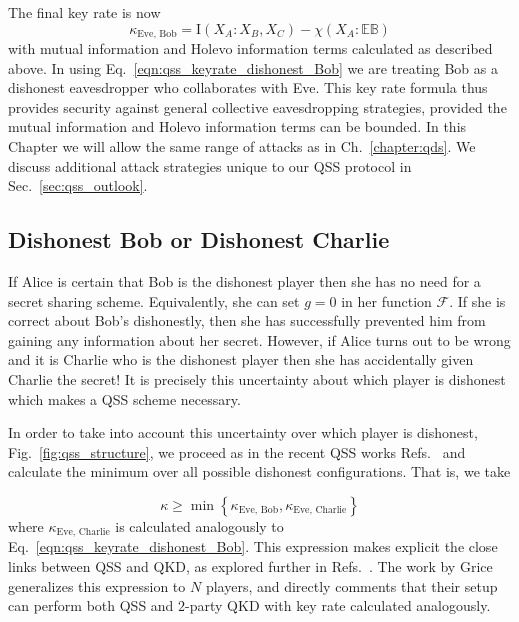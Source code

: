 The final key rate is now
\begin{equation}\label{eqn:qss_keyrate_dishonest_Bob}
\kappa_{\text{Eve, Bob}} = \text{I}\left(X_A : X_B, X_C\right) - \chi\left(X_A : \mathbb{E} \mathbb{B}\right)
\end{equation}
with mutual information and Holevo information terms calculated as described above. In using Eq.~\ref{eqn:qss_keyrate_dishonest_Bob} we are treating Bob as a dishonest eavesdropper who collaborates with Eve. This key rate formula thus provides security against general collective eavesdropping strategies, provided the mutual information and Holevo information terms can be bounded. In this Chapter we will allow the same range of attacks as in Ch.~\ref{chapter:qds}. We discuss additional attack strategies unique to our QSS protocol in Sec.~\ref{sec:qss_outlook}. 




\subsection{Dishonest Bob or Dishonest Charlie}
If Alice is certain that Bob is the dishonest player then she has no need for a secret sharing scheme. Equivalently, she can set $g=0$ in her function $\mathcal{F}$. If she is correct about Bob's dishonestly, then she has successfully prevented him from gaining any information about her secret. However, if Alice turns out to be wrong and it is Charlie who is the dishonest player then she has accidentally given Charlie the secret! It is precisely this uncertainty about which player is dishonest which makes a QSS scheme necessary.

In order to take into account this uncertainty over which player is dishonest, Fig.~\ref{fig:qss_structure}, we proceed as in the recent QSS works Refs.~\cite{Kogias2017, Grice2019} and calculate the minimum over all possible dishonest configurations. That is, we take

\begin{equation}\label{eqn:qss_key_rate_min}
\kappa \ge \min \left\{\kappa_{\text{Eve, Bob}}, \kappa_{\text{Eve, Charlie}}\right\}
\end{equation}
where $\kappa_{\text{Eve, Charlie}}$ is calculated analogously to Eq.~\ref{eqn:qss_keyrate_dishonest_Bob}. This expression makes explicit the close links between QSS and QKD, as explored further in Refs.~\cite{Kogias2017, Grice2019}. The work by Grice \cite{Grice2019} generalizes this expression to $N$ players, and directly comments that their setup can perform both QSS and $2$-party QKD with key rate calculated analogously.


